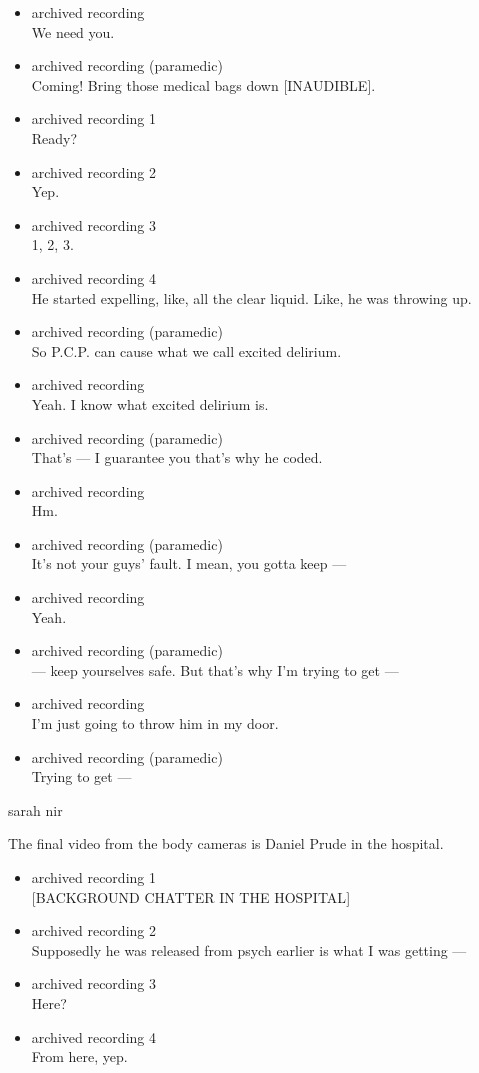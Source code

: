 \begin{itemize}
\item
  archived recording\\
  We need you.
\item
  archived recording (paramedic)\\
  Coming! Bring those medical bags down {[}INAUDIBLE{]}.
\item
  archived recording 1\\
  Ready?
\item
  archived recording 2\\
  Yep.
\item
  archived recording 3\\
  1, 2, 3.
\item
  archived recording 4\\
  He started expelling, like, all the clear liquid. Like, he was
  throwing up.
\item
  archived recording (paramedic)\\
  So P.C.P. can cause what we call excited delirium.
\item
  archived recording\\
  Yeah. I know what excited delirium is.
\item
  archived recording (paramedic)\\
  That's --- I guarantee you that's why he coded.
\item
  archived recording\\
  Hm.
\item
  archived recording (paramedic)\\
  It's not your guys' fault. I mean, you gotta keep ---
\item
  archived recording\\
  Yeah.
\item
  archived recording (paramedic)\\
  --- keep yourselves safe. But that's why I'm trying to get ---
\item
  archived recording\\
  I'm just going to throw him in my door.
\item
  archived recording (paramedic)\\
  Trying to get ---
\end{itemize}

sarah nir

The final video from the body cameras is Daniel Prude in the hospital.

\begin{itemize}
\item
  archived recording 1\\
  {[}BACKGROUND CHATTER IN THE HOSPITAL{]}
\item
  archived recording 2\\
  Supposedly he was released from psych earlier is what I was getting
  ---
\item
  archived recording 3\\
  Here?
\item
  archived recording 4\\
  From here, yep.
\end{itemize}

